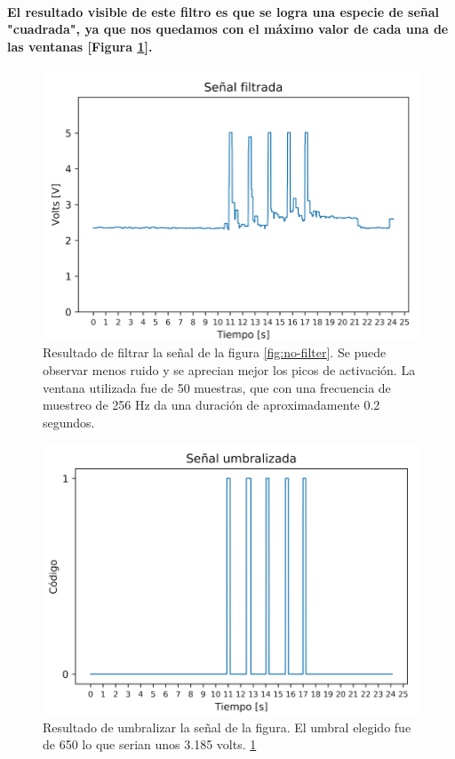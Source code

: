 \documentclass{article}
\begin{document}
\paragraph{
El resultado visible de este filtro es que se logra una especie de señal "cuadrada", ya que nos quedamos con el máximo valor de cada una de las ventanas [Figura \ref{fig:filtered}].
}

\begin{figure}[ht]
    \centering
    \includegraphics[width=\textwidth]{filtered.png}%
    \caption{Resultado de filtrar la señal de la figura \ref{fig:no-filter}. Se puede observar menos ruido y se aprecian mejor los picos de activación. La ventana utilizada fue de 50 muestras, que con una frecuencia de muestreo de 256 Hz da una duración de aproximadamente 0.2 segundos.}
    \label{fig:filtered}
\end{figure}


\begin{figure}[ht]
    \centering
    \includegraphics[width=\textwidth]{umbralized.png}%
    \caption{Resultado de umbralizar la señal de la figura. El umbral elegido fue de 650 lo que serian unos 3.185 volts.
    \ref{fig:filtered}}
    \label{fig:umbralized}
\end{figure}
\end{document}
